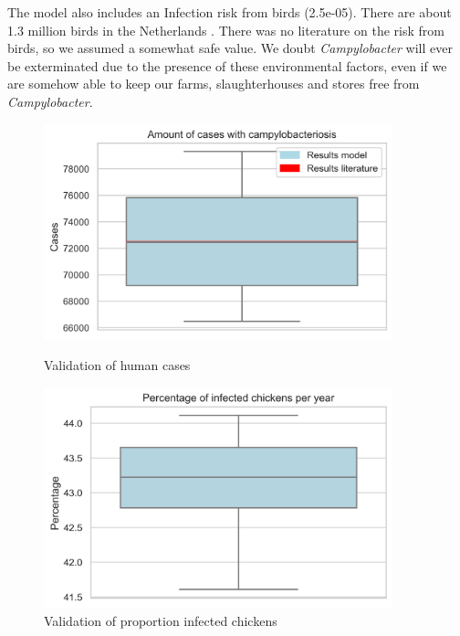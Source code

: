 The model also includes an Infection risk from birds (2.5e-05). There are about 1.3 million birds in the Netherlands \parencite{noauthor_miljoenen_2019}. There was no literature on the risk from birds, so we assumed a somewhat safe value. We doubt \textit{Campylobacter} will ever be exterminated due to the presence of these environmental factors, even if we are somehow able to keep our farms, slaughterhouses and stores free from \textit{Campylobacter}.



\begin{figure}[!h]
    \centering
    \begin{minipage}{0.45\textwidth}
        \centering
        \includegraphics[width=0.9\textwidth]{notebooks/human_cases2.png} %
        \caption{Validation of human cases}
        \label{fig:val_human_cases}
    \end{minipage}\hfill
    \begin{minipage}{0.45\textwidth}
        \centering
        \includegraphics[width=0.9\textwidth]{notebooks/chickens2.png} %
        \caption{Validation of proportion infected chickens}
	    \label{fig:val_chickens}
    \end{minipage}
\end{figure}

